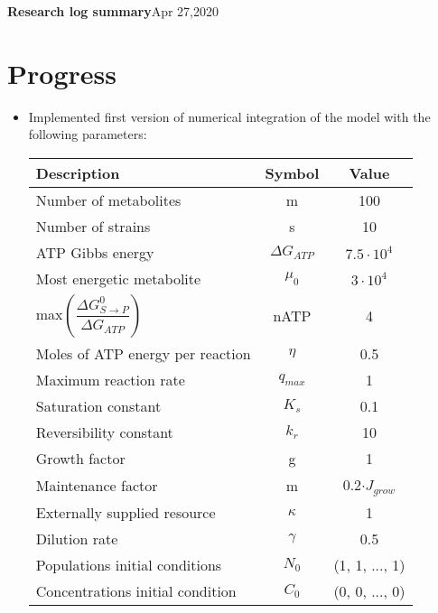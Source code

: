 \documentclass[10pt,letterpaper]{article}
\begin{document}
	
    \LARGE{\textbf{Research log summary}}\hfill\Large{Apr 27,2020}
    \section*{Progress}
	\begin{itemize}
	    \item Implemented first version of numerical integration of the model with the following parameters:\\
	    \begin{center}
	    	\begin{tabular}{ |l|c|c| } 
	    		\hline
	    		 Description & Symbol & Value \\
	    		\hline
	    		Number of metabolites & m & 100 \\ 
	    		Number of strains & s & 10 \\ 
	    		ATP Gibbs energy & $ \Delta G_{ATP} $ &$ 7.5\cdot 10^{4} $\\ 
	    		Most energetic metabolite & $ \mu_0 $ & $ 3\cdot 10^{4} $ \\ 
	    		max$\left(\dfrac{\Delta G^{0}_{S\rightarrow P}}{\Delta G_{ATP}}\right)$ & nATP & 4 \\ 
	    		Moles of ATP energy per reaction & $ \eta $ & 0.5  \\ 
	    		Maximum reaction rate & $ q_{max} $ & 1 \\ 
	    		Saturation constant & $ K_s $ & 0.1 \\ 
	    		Reversibility constant & $ k_r $ & 10 \\ 
	    		Growth factor & g & 1 \\ 
	    		Maintenance factor & m  &  0.2$\cdot J_{grow}$ \\ 
	    		Externally supplied resource & $ \kappa $  &  1 \\ 
	    		Dilution rate & $ \gamma $ &  0.5 \\ 
	    		Populations initial conditions & $ N_{0}$ &  (1, 1, ..., 1)\\ 
	    		Concentrations initial condition & $ C_{0}$ &  (0, 0, ..., 0)\\
	    		\hline
	    	\end{tabular}
	    \end{center}
    

\end{itemize}
\end{document}
